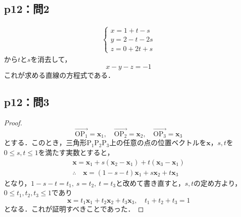 \documentclass[uplatex,dvipdfmx,a4paper,11pt,fleqn]{jsarticle}
\begin{document}
\subsection*{p12：問2}

\begin{tleftbar}
    \begin{align*}
        \begin{cases}
            x=1+t-s \\
            y=2-t -2s \\
            z=0+2t+s
        \end{cases}
    \end{align*}
    から$t$と$s$を消去して，
    \[
        x-y-z=-1
    \]
    これが求める直線の方程式である．
\end{tleftbar}

\subsection*{p12：問3}

\begin{tleftbar}
    \begin{proof}
        \[
            \overrightarrow{\mathrm{OP_1}}=\bm{x}_1,\quad \overrightarrow{\mathrm{OP_2}}=\bm{x}_2,\quad \overrightarrow{\mathrm{OP_3}}=\bm{x}_3
        \]
        とする．このとき，三角形$\mathrm{P_1 P_2 P_3}$上の任意の点の位置ベクトルを$\bm{x}$，$s,t$を$0 \le s,t \le 1$を満たす実数とすると，
        \begin{gather*}
            \bm{x}=\bm{x}_1 + s(\bm{x}_2 - \bm{x}_1) + t (\bm{x}_3 - \bm{x}_1) \\
            \therefore \quad \bm{x} = (1-s-t)\bm{x}_1 + s\bm{x}_2 + t \bm{x}_3
        \end{gather*}
        となり，$1-s-t=t_1,~s=t_2,~t=t_3$と改めて書き直すと，$s,t$の定め方より，$0 \le t_1 ,t_2,t_3 \le 1$であり
        \[
            \bm{x} = t_1\bm{x}_1 + t_2\bm{x}_2 + t_3 \bm{x}_3,\quad t_1+t_2+t_3=1
        \]
        となる．これが証明すべきことであった．
    \end{proof}
\end{tleftbar}
%
\newpage
%
\end{document}

